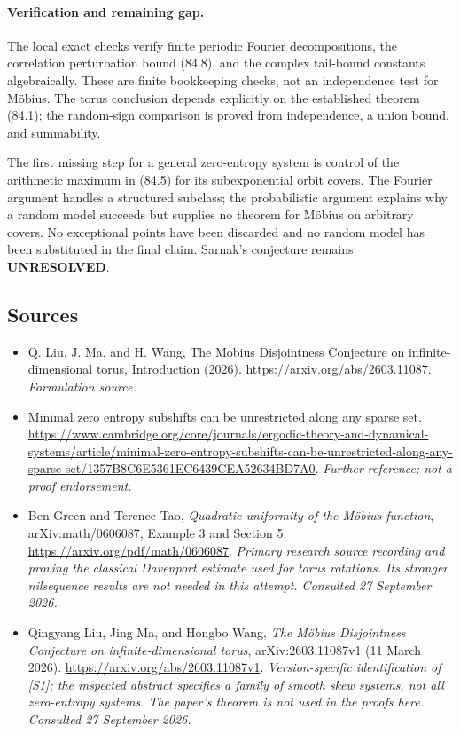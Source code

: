 \documentclass[11pt]{article}
\begin{document}
\paragraph{Verification and remaining gap.}
The local exact checks verify finite periodic Fourier decompositions,
the correlation perturbation bound (84.8), and the complex tail-bound
constants algebraically. These are finite bookkeeping checks, not an
independence test for Möbius. The torus conclusion depends explicitly on
the established theorem (84.1); the random-sign comparison is proved
from independence, a union bound, and summability.

The first missing step for a general zero-entropy system is control of
the arithmetic maximum in (84.5) for its subexponential orbit covers.
The Fourier argument handles a structured subclass; the probabilistic
argument explains why a random model succeeds but supplies no theorem
for Möbius on arbitrary covers. No exceptional points have been discarded
and no random model has been substituted in the final claim.
Sarnak's conjecture remains \textbf{UNRESOLVED}.

\subsection{Sources}
\begin{itemize}
\item[S1]Q. Liu, J. Ma, and H. Wang, The Mobius Disjointness Conjecture on infinite-dimensional torus, Introduction (2026).
\url{https://arxiv.org/abs/2603.11087}.
\textit{Formulation source.}
\item[S2]Minimal zero entropy subshifts can be unrestricted along any sparse set.
\url{https://www.cambridge.org/core/journals/ergodic-theory-and-dynamical-systems/article/minimal-zero-entropy-subshifts-can-be-unrestricted-along-any-sparse-set/1357B8C6E5361EC6439CEA52634BD7A0}.
\textit{Further reference; not a proof endorsement.}

\item[E1]Ben Green and Terence Tao, \emph{Quadratic uniformity of the
M\"obius function}, arXiv:math/0606087, Example 3 and Section 5.
\url{https://arxiv.org/pdf/math/0606087}.
\textit{Primary research source recording and proving the classical
Davenport estimate used for torus rotations. Its stronger nilsequence
results are not needed in this attempt. Consulted 27 September 2026.}
\item[E2]Qingyang Liu, Jing Ma, and Hongbo Wang,
\emph{The M\"obius Disjointness Conjecture on infinite-dimensional torus},
arXiv:2603.11087v1 (11 March 2026).
\url{https://arxiv.org/abs/2603.11087v1}.
\textit{Version-specific identification of [S1]; the inspected abstract
specifies a family of smooth skew systems, not all zero-entropy systems.
The paper's theorem is not used in the proofs here.
Consulted 27 September 2026.}
\end{itemize}
\end{document}
